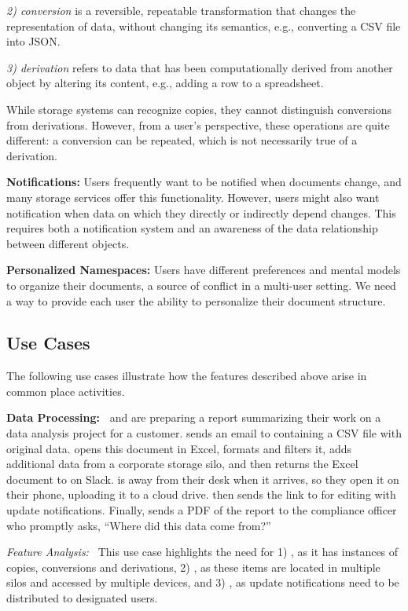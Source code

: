 \noindent \emph{2) conversion} is a reversible, repeatable transformation that changes the representation of data, without changing its semantics, e.g., converting a CSV file into JSON.

\noindent \emph{3) derivation} refers to data that has been computationally derived from another object by altering its content, e.g., adding a row to a spreadsheet.

While storage systems can recognize copies, they cannot distinguish conversions from derivations. However, from a user's perspective, these operations are quite different: a conversion can be repeated, which is not necessarily true of a derivation.
                                              
\noindent\textbf{Notifications:}
Users frequently want to be notified when documents change, and many storage services offer this functionality.
However, users might also want notification when data on which they directly or indirectly depend changes. This requires both a notification system and an awareness of the data relationship between different objects.

\noindent\textbf{Personalized Namespaces:}
Users have different preferences and mental models to organize their documents, a source of conflict in a multi-user setting. We need a way to provide each user the ability to personalize their document structure.

\subsection{Use Cases}
The following use cases illustrate how the features described above arise in common place activities.

\noindent\textbf{Data Processing:~}
\persa and \persc are preparing a report summarizing their work on a data analysis project for a customer.
\persc sends an email to \persa containing a CSV file with original data.
\persa opens this document in Excel, formats and filters it, adds additional data from a corporate storage silo,
and then returns the Excel document to \persc on Slack.
\persc is away from their desk when it arrives, so they open it on their phone, uploading it to a cloud drive.
\persc then sends the link to \persa for editing with update notifications.
Finally, \persc sends a PDF of the report to the compliance officer who promptly asks, ``Where did this data come from?''

\noindent\textit{Feature Analysis:~}
This use case highlights the need for 1) \usecasedatarelationship, as it has instances of copies, conversions and derivations, 2) \usecasecrosssilosearch, as these items are located in multiple silos and accessed by multiple devices, and 3) \usecasenotifications, as update notifications need to be distributed to designated users.

